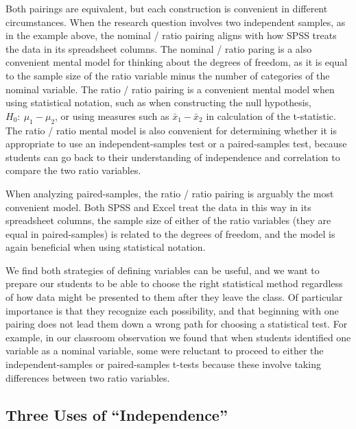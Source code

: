 \documentclass[12pt]{article}
\begin{document}
Both pairings are equivalent, but each construction is convenient in different circumstances.  When the research question involves two independent samples, as in the example above, the nominal / ratio pairing aligns with how SPSS treats the data in its spreadsheet columns.  The nominal / ratio paring is a also convenient mental model for thinking about the degrees of freedom, as it is equal to the sample size of the ratio variable minus the number of categories of the nominal variable.  The ratio / ratio pairing is a convenient mental model when using statistical notation, such as when constructing the null hypothesis, $H_0:~ \mu_1 - \mu_2$, or using measures such as $\bar{x}_1 - \bar{x}_2$ in calculation of the t-statistic.  The ratio / ratio mental model is also convenient for determining whether it is appropriate to use an independent-samples test or a paired-samples test, because students can go back to their understanding of independence and correlation to compare the two ratio variables.    

When analyzing paired-samples, the ratio / ratio pairing is arguably the most convenient model.  Both SPSS and Excel treat the data in this way in its spreadsheet columns, the sample size of either of the ratio variables (they are equal in paired-samples) is related to the degrees of freedom, and the model is again beneficial when using statistical notation.

We find both strategies of defining variables can be useful, and we want to prepare our students to be able to choose the right statistical method regardless of how data might be presented to them after they leave the class.  Of particular importance is that they recognize each possibility, and that beginning with one pairing does not lead them down a wrong path for choosing a statistical test.  For example, in our classroom observation we found that when students identified one variable as a nominal variable, some were reluctant to proceed to either the independent-samples or paired-samples t-tests because these involve taking differences between two ratio variables.

\subsection{Three Uses of ``Independence''}
\end{document}
